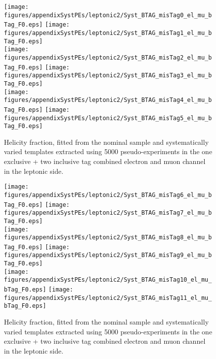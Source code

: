 \begin{figure}[!hb]
\begin{center}
        \texttt{[image: figures/appendixSystPEs/leptonic2/Syst\_BTAG\_misTag0\_el\_mu\_bTag\_F0.eps]}
        \texttt{[image: figures/appendixSystPEs/leptonic2/Syst\_BTAG\_misTag1\_el\_mu\_bTag\_F0.eps]}\\
        \texttt{[image: figures/appendixSystPEs/leptonic2/Syst\_BTAG\_misTag2\_el\_mu\_bTag\_F0.eps]}
        \texttt{[image: figures/appendixSystPEs/leptonic2/Syst\_BTAG\_misTag3\_el\_mu\_bTag\_F0.eps]}\\
        \texttt{[image: figures/appendixSystPEs/leptonic2/Syst\_BTAG\_misTag4\_el\_mu\_bTag\_F0.eps]}
        \texttt{[image: figures/appendixSystPEs/leptonic2/Syst\_BTAG\_misTag5\_el\_mu\_bTag\_F0.eps]}
        
\caption{Helicity fraction, \fo fitted from the nominal \ttbar sample and systematically varied templates extracted using 5000 pseudo-experiments in the one exclusive + two inclusive \bt tag combined electron and muon channel in the leptonic side. }
\label{fig:systematicVar_lep_f0_elmu2incl_btag3_1}
\end{center}
\end{figure}

\begin{figure}[!hb]
\begin{center}
        \texttt{[image: figures/appendixSystPEs/leptonic2/Syst\_BTAG\_misTag6\_el\_mu\_bTag\_F0.eps]}
        \texttt{[image: figures/appendixSystPEs/leptonic2/Syst\_BTAG\_misTag7\_el\_mu\_bTag\_F0.eps]}\\
        \texttt{[image: figures/appendixSystPEs/leptonic2/Syst\_BTAG\_misTag8\_el\_mu\_bTag\_F0.eps]}
        \texttt{[image: figures/appendixSystPEs/leptonic2/Syst\_BTAG\_misTag9\_el\_mu\_bTag\_F0.eps]}\\
        \texttt{[image: figures/appendixSystPEs/leptonic2/Syst\_BTAG\_misTag10\_el\_mu\_bTag\_F0.eps]}
        \texttt{[image: figures/appendixSystPEs/leptonic2/Syst\_BTAG\_misTag11\_el\_mu\_bTag\_F0.eps]}
        
\caption{Helicity fraction, \fo fitted from the nominal \ttbar sample and systematically varied templates extracted using 5000 pseudo-experiments in the one exclusive + two inclusive \bt tag combined electron and muon channel in the leptonic side. }
\label{fig:systematicVar_lep_f0_elmu2incl_btag3_2}
\end{center}
\end{figure}

